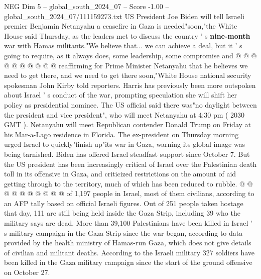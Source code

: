 \begin{textsample}{NEG Dim 5 – global\_south\_2024\_07 – Score -1.00 – global\_south\_2024\_07/111159273.txt}
US President Joe Biden will tell Israeli premier Benjamin Netanyahu a ceasefire in Gaza is needed"soon,"the White House said Thursday, as the leaders met to discuss the country ' s \textbf{nine-month} war with Hamas militants."We believe that... we can achieve a deal, but it ' s going to require, as it always does, some leadership, some compromise and @ @ @ @ @ @ @ @ @ @ reaffirming for Prime Minister Netanyahu that he believes we need to get there, and we need to get there soon,"White House national security spokesman John Kirby told reporters.
Harris has previously been more outspoken about Israel ' s conduct of the war, prompting speculation she will shift her policy as presidential nominee.
The US official said there was"no daylight between the president and vice president", who will meet Netanyahu at 4:30 pm ( 2030 GMT ).
Netanyahu will meet Republican contender Donald Trump on Friday at his Mar-a-Lago residence in Florida.
The ex-president on Thursday morning urged Israel to quickly"finish up"its war in Gaza, warning its global image was being tarnished.
Biden has offered Israel steadfast support since October 7.
But the US president has been increasingly critical of Israel over the Palestinian death toll in its offensive in Gaza, and criticized restrictions on the amount of aid getting through to the territory, much of which has been reduced to rubble. @ @ @ @ @ @ @ @ @ @ of 1,197 people in Israel, most of them civilians, according to an AFP tally based on official Israeli figures.
Out of 251 people taken hostage that day, 111 are still being held inside the Gaza Strip, including 39 who the military says are dead.
More than 39,100 Palestinians have been killed in Israel ' s military campaign in the Gaza Strip since the war began, according to data provided by the health ministry of Hamas-run Gaza, which does not give details of civilian and militant deaths.
According to the Israeli military 327 soldiers have been killed in the Gaza military campaign since the start of the ground offensive on October 27.

\end{textsample}
